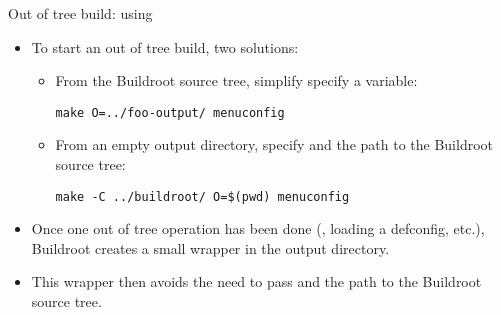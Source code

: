 \begin{frame}[fragile]{Out of tree build: using}
  \begin{itemize}
  \item To start an out of tree build, two solutions:
    \begin{itemize}
    \item From the Buildroot source tree, simplify specify a 
      variable:
      \begin{block}{}
\begin{verbatim}
make O=../foo-output/ menuconfig
\end{verbatim}
      \end{block}
    \item From an empty output directory, specify  and the
      path to the Buildroot source tree:
      \begin{block}{}
\begin{verbatim}
make -C ../buildroot/ O=$(pwd) menuconfig
\end{verbatim}
      \end{block}
    \end{itemize}
  \item Once one out of tree operation has been done
    (, loading a defconfig, etc.), Buildroot creates
    a small wrapper  in the output directory.
  \item This wrapper  then avoids the need to pass
     and the path to the Buildroot source tree.
  \end{itemize}
\end{frame}

